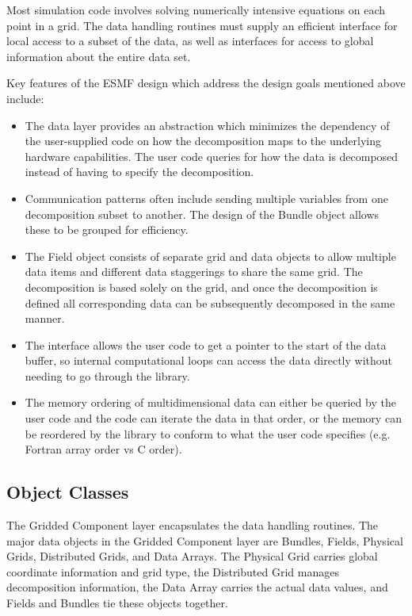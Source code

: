 Most simulation code involves solving numerically intensive
equations on each point in a grid.  The data handling routines
must supply an efficient interface for local access to a
subset of the data, as well as interfaces for access to
global information about the entire data set.

Key features of the ESMF design which address the design goals
mentioned above include:
\begin{itemize}
\item The data layer provides an abstraction which
minimizes the dependency of the user-supplied code on 
how the decomposition maps to the underlying hardware
capabilities.  The user code queries for how the data
is decomposed instead of having to specify the decomposition.
\item Communication patterns often include sending multiple
variables from one decomposition subset to another.  
The design of the Bundle object
allows these to be grouped for efficiency.
\item The Field object consists of separate grid and data 
objects to allow multiple data items and different data staggerings
to share the same grid.  The decomposition is based solely on
the grid, and once the decomposition is defined all corresponding
data can be subsequently decomposed in the same manner.
\item The interface allows the user code to get a pointer to the
start of the data buffer, so internal computational loops can access
the data directly without needing to go through the library.
\item The memory ordering of multidimensional data can either be
queried by the user code and the code can iterate the data in that
order, or the memory can be reordered by the library to conform to what
the user code specifies (e.g. Fortran array order vs C order).

\end{itemize}

\subsection{Object Classes}

The Gridded Component layer encapsulates the data handling routines.
The major data objects in the Gridded Component layer are Bundles,
Fields, Physical Grids, Distributed Grids, and Data Arrays.
The Physical Grid carries global coordinate information and grid type,
the Distributed Grid manages decomposition information, 
the Data Array carries the actual
data values, and Fields and Bundles tie these objects together.

